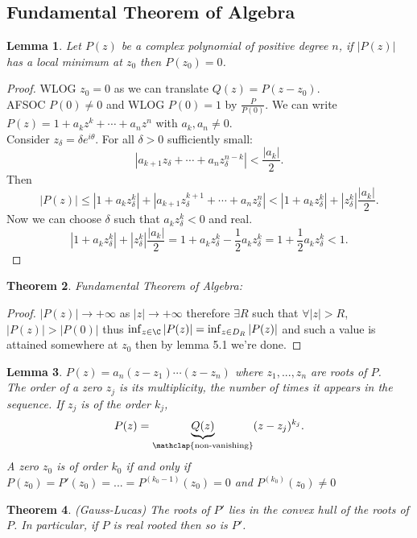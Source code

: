 \documentclass[a4paper]{article}
\newtheorem{thm}{Theorem}[section]
\newtheorem{lem}[thm]{Lemma}
\begin{document}
\subsection{Fundamental Theorem of Algebra}
\begin{lem}
    Let $P(z)$ be a complex polynomial of positive degree $n$, if $|P(z)|$ has a local minimum at $z_0$ then $P(z_0)=0$.
\end{lem}
\begin{proof}
    WLOG $z_0=0$ as we can translate $Q(z)=P(z-z_0)$. \\AFSOC $P(0)\neq 0$ and WLOG $P(0)=1$ by $\frac{P}{P(0)}$. We can write $P(z)=1+a_kz^k+\cdots+a_nz^n$ with $a_k,a_n\neq 0$. \\
    Consider $z_\delta = \delta e^{i\theta}.$ For all $\delta>0$ sufficiently small: 
    \[
    \left | a_{k+1}z_\delta + \cdots + a_nz_\delta^{n-k}\right |<\frac{|a_k|}{2}
    .\]  
    Then \[
    |P(z)|\leq \left | 1+a_kz_\delta^k\right | + \left |a_{k+1}z_\delta^{k+1}+\cdots+a_nz_\delta^n\right |< \left | 1+a_kz_\delta^k\right |+\left |z_\delta^k\right | \frac{|a_k|}{2}
    .\]
    Now we can choose $\delta$ such that $a_kz_\delta^k<0$ and real. 
    \[
    \left | 1+a_kz_\delta^k\right |+\left |z_\delta^k\right | \frac{|a_k|}{2}=1+a_kz_\delta^k-\frac{1}{2}a_kz_\delta^k=1+\frac{1}{2}a_kz_\delta^k<1
    .\] 
\end{proof}
\begin{thm}
    Fundamental Theorem of Algebra:
\end{thm}
\begin{proof}
    $|P(z)|\to +\infty$ as $|z|\to+\infty$ therefore $\exists R$ such that $\forall |z|>R$, $|P(z)|>|P(0)|$ thus $\inf_{z\in \C}|P(z)|=\inf_{z\in D_R}|P(z)|$ and such a value is attained somewhere at $z_0$ then by lemma 5.1 we're done. 
\end{proof}
\begin{lem}
    $P(z)=a_n(z-z_1)\cdots(z-z_n)$ where $z_1,...,z_n$ are roots of $P$.\\ The order of a zero $z_j$ is its multiplicity, the number of times it appears in the sequence. If $z_j$ is of the order $k_j$, \[
    P(z)=\underbrace{Q(z)}_{\mathclap{\text{non-vanishing}}}(z-z_j)^{k_j}
    .\] 
    A zero $z_0$ is of order $k_0$ if and only if $P(z_0)=P'(z_0)=...=P^{(k_0-1)}(z_0)=0$ and $P^{(k_0)}(z_0)\neq 0$
\end{lem}
\begin{thm}
    (Gauss-Lucas) The roots of $P'$ lies in the convex hull of the roots of $P$. In particular, if $P$ is real rooted then so is $P'$. 
\end{thm}
\end{document}
